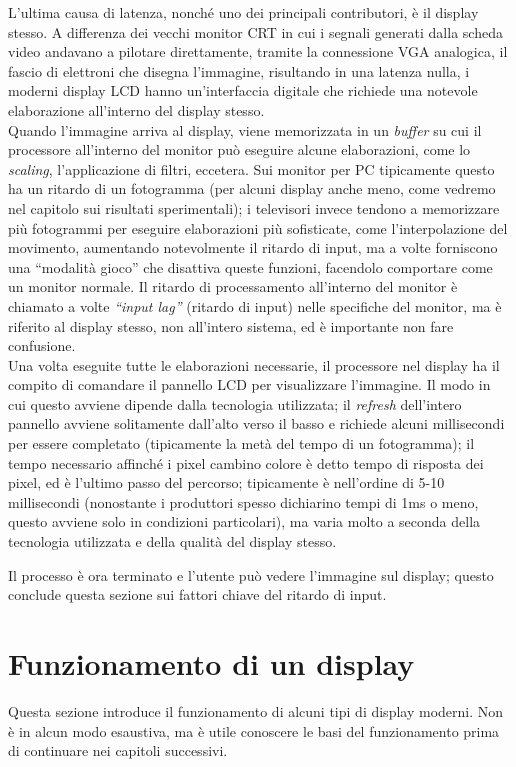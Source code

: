 L'ultima causa di latenza, nonché uno dei principali contributori, è il display stesso. A differenza dei vecchi monitor CRT in cui i segnali generati dalla scheda video andavano a pilotare direttamente, tramite la connessione VGA analogica, il fascio di elettroni che disegna l'immagine, risultando in una latenza nulla, i moderni display LCD hanno un'interfaccia digitale che richiede una notevole elaborazione all'interno del display stesso.\\
Quando l'immagine arriva al display, viene memorizzata in un \textit{buffer} su cui il processore all'interno del monitor può eseguire alcune elaborazioni, come lo \textit{scaling}, l'applicazione di filtri, eccetera. Sui monitor per PC tipicamente questo ha un ritardo di un fotogramma (per alcuni display anche meno, come vedremo nel capitolo sui risultati sperimentali); i televisori invece tendono a memorizzare più fotogrammi per eseguire elaborazioni più sofisticate, come l'interpolazione del movimento, aumentando notevolmente il ritardo di input, ma a volte forniscono una ``modalità gioco'' che disattiva queste funzioni, facendolo comportare come un monitor normale. Il ritardo di processamento all'interno del monitor è chiamato a volte \textit{``input lag''} (ritardo di input) nelle specifiche del monitor, ma è riferito al display stesso, non all'intero sistema, ed è importante non fare confusione.\\
Una volta eseguite tutte le elaborazioni necessarie, il processore nel display ha il compito di comandare il pannello LCD per visualizzare l'immagine. Il modo in cui questo avviene dipende dalla tecnologia utilizzata; il \textit{refresh} dell'intero pannello avviene solitamente dall'alto verso il basso e richiede alcuni millisecondi per essere completato (tipicamente la metà del tempo di un fotogramma); il tempo necessario affinché i pixel cambino colore è detto tempo di risposta dei pixel, ed è l'ultimo passo del percorso; tipicamente è nell'ordine di 5-10 millisecondi (nonostante i produttori spesso dichiarino tempi di 1ms o meno, questo avviene solo in condizioni particolari), ma varia molto a seconda della tecnologia utilizzata e della qualità del display stesso.

Il processo è ora terminato e l'utente può vedere l'immagine sul display; questo conclude questa sezione sui fattori chiave del ritardo di input.

\section{Funzionamento di un display}
Questa sezione introduce il funzionamento di alcuni tipi di display moderni. Non è in alcun modo esaustiva, ma è utile conoscere le basi del funzionamento prima di continuare nei capitoli successivi.

